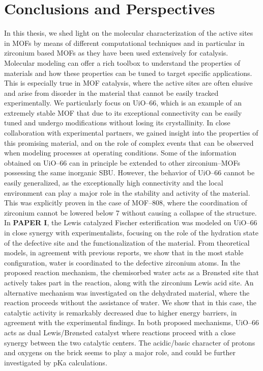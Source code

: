 \graphicspath{{figures/}}
\renewcommand\evenpagerightmark{{\scshape\small Conclusions and perspectives}} 
\renewcommand\oddpageleftmark{{\scshape\small Chapter 4}}


\hyphenation{}

\chapter[Conclusions and perspectives]%
{Conclusions and Perspectives}
\label{ch4}
In this thesis, we shed light on the molecular characterization of the active sites in MOFs by means of different computational techniques and in particular in zirconium based MOFs as they have been used extensively for catalysis. Molecular modeling can offer a rich toolbox to understand the properties of materials and how these properties can be tuned to target specific applications. This is especially true in MOF catalysis, where the active sites are often elusive and arise from disorder in the material that cannot be easily tracked experimentally. We particularly focus on UiO--66, which is an example of an extremely stable MOF that due to its exceptional connectivity can be easily tuned and undergo modifications without losing its crystallinity. In close collaboration with experimental partners, we gained insight into the properties of this promising material, and on the role of complex events that can be observed when modeling processes at operating conditions. Some of the information obtained on UiO--66 can in principle be extended to other zirconium--MOFs possessing the same inorganic SBU. However, the behavior of UiO--66 cannot be easily generalized, as the exceptionally high connectivity and the local environment can play a major role in the stability and activity of the material. This was explicitly proven in the case of MOF--808, where the coordination of zirconium cannot be lowered below 7 without causing a collapse of the structure.
\npar
In \textbf{PAPER I}, the Lewis catalyzed Fischer esterification was modeled on UiO--66 in close synergy with experimentalists, focusing on the role of the hydration state of the defective site and the functionalization of the material. From theoretical models, in agreement with previous reports, we show that in the most stable configuration, water is coordinated to the defective zirconium atoms. In the proposed reaction mechanism, the chemisorbed water acts as a Br\o{}nsted site that actively takes part in the reaction, along with the zirconium Lewis acid site. An alternative mechanism was investigated on the dehydrated material, where the reaction proceeds without the assistance of water. We show that in this case, the catalytic activity is remarkably decreased due to higher energy barriers, in agreement with the experimental findings. In both proposed mechanisms, UiO--66 acts as dual Lewis/Br\o{}nsted catalyst where reactions proceed with a close synergy between the two catalytic centers. The acidic/basic character of protons and oxygens on the brick seems to play a major role, and could be further investigated by pKa calculations.
